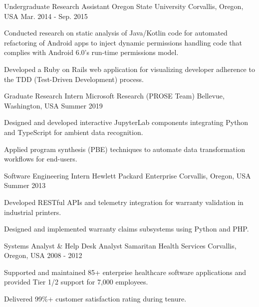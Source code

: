 \begin{cventries}
  \begin{detailSection}
    \cventry
      {Undergraduate Research Assistant} %
      {Oregon State University} %
      {Corvallis, Oregon, USA} %
      {Mar. 2014 - Sep. 2015} %
      {
        \begin{cvitems} %
          \item {Conducted research on static analysis of Java/Kotlin code for automated refactoring of Android apps to inject dynamic permissions handling code that complies with Android 6.0's run-time permissions model.}
      	\item {Developed a Ruby on Rails web application for visualizing developer adherence to the TDD (Test-Driven Development) process.}
        \end{cvitems}
      }    
  \end{detailSection}

  \cventry
    {Graduate Research Intern} %
    {Microsoft Research (PROSE Team)} %
    {Bellevue, Washington, USA} %
    {Summer 2019} %
    {
   	  \begin{cvitems} %
        \item {Designed and developed interactive JupyterLab components integrating Python and TypeScript for ambient data recognition.}
        \item {Applied program synthesis (PBE) techniques to automate data transformation workflows for end-users.}
      \end{cvitems}
    }
    
  \cventry
    {Software Engineering Intern} %
    {Hewlett Packard Enterprise} %
    {Corvallis, Oregon, USA} %
    {Summer 2013} %
    {
      \begin{cvitems} %
        \item {Developed RESTful APIs and telemetry integration for warranty validation in industrial printers.}
        \item {Designed and implemented warranty claims subsystems using Python and PHP.}
      \end{cvitems}
    }

  \cventry
    {Systems Analyst \& Help Desk Analyst} %
    {Samaritan Health Services} %
    {Corvallis, Oregon, USA} %
    {2008 - 2012} %
    {
      \begin{cvitems} %
        \item {Supported and maintained 85+ enterprise healthcare software applications and provided Tier 1/2 support for 7,000 employees.}
        \item {Delivered 99\%+ customer satisfaction rating during tenure.} 
      \end{cvitems}
    }
    

\end{cventries}
